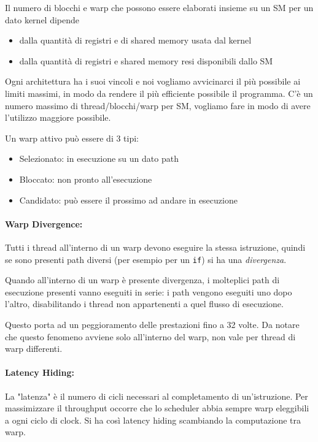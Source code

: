Il numero di blocchi e warp che possono essere elaborati insieme su un SM per un dato kernel dipende
\begin{itemize}
	\item dalla quantità di registri e di shared memory usata dal kernel
	
	\item dalla quantità di registri e shared memory resi disponibili dallo SM
\end{itemize}

Ogni architettura ha i suoi vincoli e noi vogliamo avvicinarci il più possibile ai limiti massimi, in modo da rendere il più efficiente possibile il programma. C'è un numero massimo di thread/blocchi/warp per SM, vogliamo fare in modo di avere l'utilizzo maggiore possibile.

Un warp attivo può essere di 3 tipi: 
\begin{itemize}
	\item Selezionato: in esecuzione su un dato path
	
	\item Bloccato: non pronto all'esecuzione
	
	\item Candidato: può essere il prossimo ad andare in esecuzione
\end{itemize}

\paragraph{Warp Divergence:} Tutti i thread all'interno di un warp devono eseguire la stessa istruzione, quindi se sono presenti path diversi  (per esempio per un \texttt{if}) si ha una \textit{divergenza}. 

Quando all'interno di un warp è presente divergenza, i molteplici path di esecuzione presenti vanno eseguiti in serie: i path vengono eseguiti uno dopo l'altro, disabilitando i thread non appartenenti a quel flusso di esecuzione.

Questo porta ad un peggioramento delle prestazioni fino a 32 volte. Da notare che questo fenomeno avviene solo all'interno del warp, non vale per thread di warp differenti.

\paragraph{Latency Hiding:} La "latenza" è il numero di cicli necessari al completamento di un'istruzione. Per massimizzare il throughput occorre che lo scheduler abbia sempre warp eleggibili a ogni ciclo di clock. Si ha così latency hiding scambiando la computazione tra warp.

